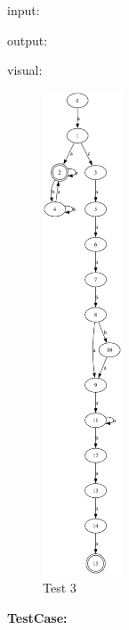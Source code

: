 \documentclass{hdureport}
\begin{document}
\noindent\textsf{input:}

\noindent\textsf{output:}

\newpage
\noindent\textsf{visual:}
\begin{figure}[H]
    \centering
    \includegraphics[width=0.21\textwidth]{dfa_test/3.png}
    \caption{Test 3}
\end{figure}

\newpage

\noindent\textbf{TestCase:} 
\end{document}
